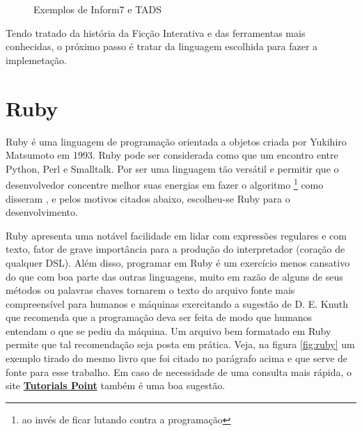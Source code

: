 \begin{figure}
  \centering
  \caption{Exemplos de Inform7 e TADS}
  \label{fig:other-tools}
\end{figure}

Tendo tratado da história da Ficção Interativa e das ferramentas mais conhecidas,
o próximo passo é tratar da linguagem escolhida para fazer a implemetação.

\section{Ruby}
\label{sec:ruby}

Ruby é uma linguagem de programação orientada a objetos criada por Yukihiro
Matsumoto em 1993. Ruby pode ser considerada como que um encontro entre Python,
Perl e Smalltalk. Por ser uma linguagem tão versátil e permitir que o
desenvolvedor concentre melhor suas energias em fazer o algoritmo \footnote{ao
invés de ficar lutando contra a programação}  como disseram \citet{Rcook:09}, e
pelos motivos citados abaixo, escolheu-se Ruby para o desenvolvimento.

Ruby apresenta uma notável facilidade em lidar com expressões regulares e com
texto, fator de grave importância para a produção do interpretador (coração de
qualquer DSL). Além disso, programar em Ruby é um exercício menos cansativo do
que com boa parte das outras linguagens, muito em razão de alguns de seus métodos
ou palavras chaves tornarem o texto do arquivo fonte mais compreensível para
humanos e máquinas exercitando a sugestão de D. E. Knuth que recomenda que a
programação deva ser feita de modo que humanos entendam o que se pediu da máquina.
Um arquivo bem formatado em Ruby permite que tal recomendação seja posta em
prática. Veja, na figura \ref{fig:ruby} um exemplo tirado do mesmo livro que foi
citado no parágrafo acima e que serve de fonte para esse trabalho. Em caso de
necessidade de uma consulta mais rápida, o site
\href{https://www.tutorialspoint.com/ruby/index.htm}{\textbf{Tutorials Point}}
também é uma boa sugestão.

